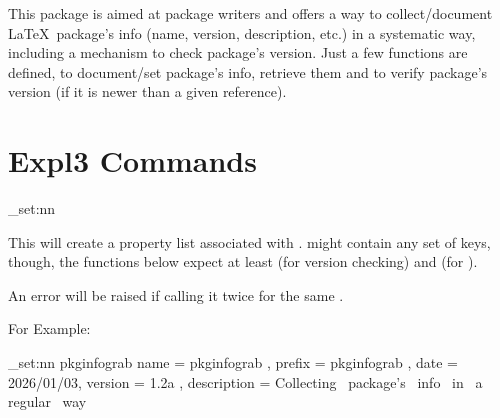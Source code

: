 \documentclass[10pt]{article}
\begin{document}
  

\begin{typesetabstract}

This package is aimed at package writers and offers a way to collect/document \LaTeX\ package's info (name, version, description, etc.) in a systematic way, including a mechanism to check package's version. Just a few functions are defined, to document/set package's info, retrieve them and to verify package's version (if it is newer than a given reference).

\end{typesetabstract}





\section{Expl3 Commands}\label{expl3-cmds}


\begin{codedescribe}{\pkginfograb_set:nn}
\begin{codesyntax}%
\end{codesyntax}
This will create a property list associated with .  might contain any set of keys, though, the functions below expect at least  (for version checking) and  (for ).
\end{codedescribe}
\begin{tsremark}
  An error will be raised if calling it twice for the same .
\end{tsremark}

 For Example:
\begin{codestore}[demoA]
\pkginfograb_set:nn {pkginfograb}
  { 
    name         = {pkginfograb} ,
    prefix       = {pkginfograb} ,
    date         = {2026/01/03},
    version      = {1.2a} ,
    description  = {Collecting~ package's~ info~ in~ a~ regular~ way}
  }
\end{codestore}
\end{document}

